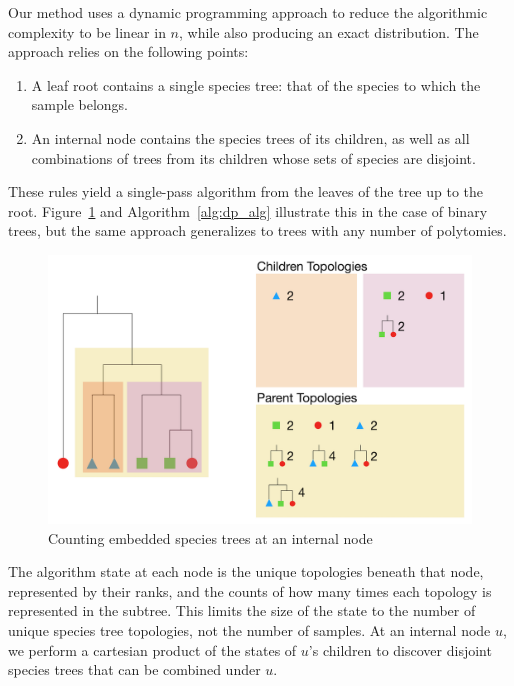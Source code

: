 \documentclass{article}
\begin{document}
Our method uses a dynamic programming approach to reduce the algorithmic
complexity to be linear in $n$, while also producing an exact distribution.
The approach relies on the following points:
\begin{enumerate}
    \item A leaf root contains a single species tree: that of the species to
        which the sample belongs.
    \item An internal node contains the species trees of its children, as
        well as all combinations of trees from its children whose
        sets of species are disjoint.
\end{enumerate}
These rules yield a single-pass algorithm from the leaves of the tree
up to the root. Figure~\ref{fig:dp_alg} and Algorithm~\ref{alg:dp_alg}
illustrate this in the case of binary trees, but the same approach generalizes
to trees with any number of polytomies.

\begin{figure}[H]
    \includegraphics[scale=0.5]{dp_alg}
    \centering
    \caption{Counting embedded species trees at an internal node}\label{fig:dp_alg}
\end{figure}

The algorithm state at each node is the unique topologies beneath that node,
represented by their ranks, and the
counts of how many times each topology is represented in the subtree. This
limits the size of the state to the number of unique species tree topologies,
not the number of samples. At an internal node $u$, we perform a cartesian
product of the states of $u$'s children to discover disjoint species trees that
can be combined under $u$.
\end{document}
